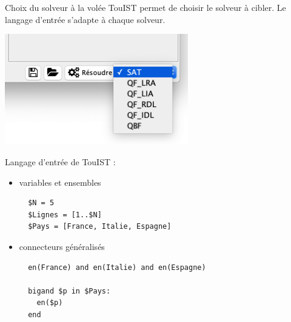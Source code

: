 \documentclass[english,french,usenames,dvipsnames]{beamer}
\begin{document}
\begin{frame}{\subsecname}
\begin{block}{Choix du solveur à la volée}
TouIST permet de choisir le solveur à cibler. Le langage d'entrée s'adapte à chaque solveur.
\end{block}
\begin{center}\includegraphics[width=0.6\textwidth]{figures/touist-selecteur.png}\end{center}
\end{frame}

\begin{frame}[containsverbatim]{\subsecname}
Langage d'entrée de TouIST :
\begin{itemize}
    \item \alert{variables} et \alert{ensembles} \\[5pt]
    \begin{small}\begin{verbatim}
  $N = 5
  $Lignes = [1..$N]
  $Pays = [France, Italie, Espagne]
    \end{verbatim}\end{small}
    \item \alert{connecteurs généralisés} \\[5pt]
    \begin{small}\begin{verbatim}
  en(France) and en(Italie) and en(Espagne)

  bigand $p in $Pays:
    en($p)
  end
    \end{verbatim}\end{small}
\end{itemize}
\end{frame}
\end{document}

